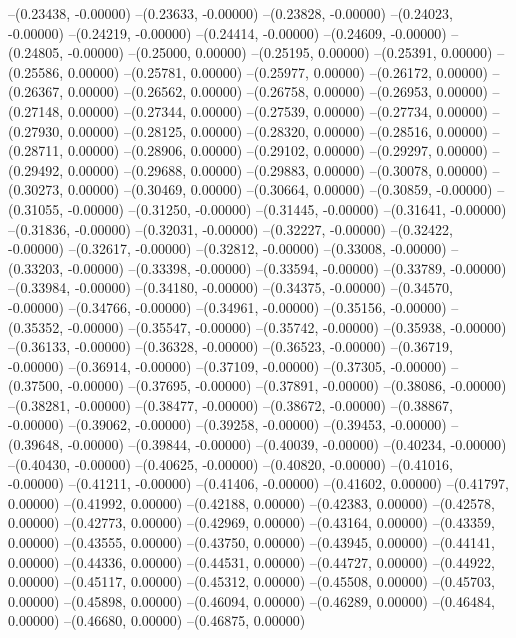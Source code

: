 --(0.23438, -0.00000)
--(0.23633, -0.00000)
--(0.23828, -0.00000)
--(0.24023, -0.00000)
--(0.24219, -0.00000)
--(0.24414, -0.00000)
--(0.24609, -0.00000)
--(0.24805, -0.00000)
--(0.25000, 0.00000)
--(0.25195, 0.00000)
--(0.25391, 0.00000)
--(0.25586, 0.00000)
--(0.25781, 0.00000)
--(0.25977, 0.00000)
--(0.26172, 0.00000)
--(0.26367, 0.00000)
--(0.26562, 0.00000)
--(0.26758, 0.00000)
--(0.26953, 0.00000)
--(0.27148, 0.00000)
--(0.27344, 0.00000)
--(0.27539, 0.00000)
--(0.27734, 0.00000)
--(0.27930, 0.00000)
--(0.28125, 0.00000)
--(0.28320, 0.00000)
--(0.28516, 0.00000)
--(0.28711, 0.00000)
--(0.28906, 0.00000)
--(0.29102, 0.00000)
--(0.29297, 0.00000)
--(0.29492, 0.00000)
--(0.29688, 0.00000)
--(0.29883, 0.00000)
--(0.30078, 0.00000)
--(0.30273, 0.00000)
--(0.30469, 0.00000)
--(0.30664, 0.00000)
--(0.30859, -0.00000)
--(0.31055, -0.00000)
--(0.31250, -0.00000)
--(0.31445, -0.00000)
--(0.31641, -0.00000)
--(0.31836, -0.00000)
--(0.32031, -0.00000)
--(0.32227, -0.00000)
--(0.32422, -0.00000)
--(0.32617, -0.00000)
--(0.32812, -0.00000)
--(0.33008, -0.00000)
--(0.33203, -0.00000)
--(0.33398, -0.00000)
--(0.33594, -0.00000)
--(0.33789, -0.00000)
--(0.33984, -0.00000)
--(0.34180, -0.00000)
--(0.34375, -0.00000)
--(0.34570, -0.00000)
--(0.34766, -0.00000)
--(0.34961, -0.00000)
--(0.35156, -0.00000)
--(0.35352, -0.00000)
--(0.35547, -0.00000)
--(0.35742, -0.00000)
--(0.35938, -0.00000)
--(0.36133, -0.00000)
--(0.36328, -0.00000)
--(0.36523, -0.00000)
--(0.36719, -0.00000)
--(0.36914, -0.00000)
--(0.37109, -0.00000)
--(0.37305, -0.00000)
--(0.37500, -0.00000)
--(0.37695, -0.00000)
--(0.37891, -0.00000)
--(0.38086, -0.00000)
--(0.38281, -0.00000)
--(0.38477, -0.00000)
--(0.38672, -0.00000)
--(0.38867, -0.00000)
--(0.39062, -0.00000)
--(0.39258, -0.00000)
--(0.39453, -0.00000)
--(0.39648, -0.00000)
--(0.39844, -0.00000)
--(0.40039, -0.00000)
--(0.40234, -0.00000)
--(0.40430, -0.00000)
--(0.40625, -0.00000)
--(0.40820, -0.00000)
--(0.41016, -0.00000)
--(0.41211, -0.00000)
--(0.41406, -0.00000)
--(0.41602, 0.00000)
--(0.41797, 0.00000)
--(0.41992, 0.00000)
--(0.42188, 0.00000)
--(0.42383, 0.00000)
--(0.42578, 0.00000)
--(0.42773, 0.00000)
--(0.42969, 0.00000)
--(0.43164, 0.00000)
--(0.43359, 0.00000)
--(0.43555, 0.00000)
--(0.43750, 0.00000)
--(0.43945, 0.00000)
--(0.44141, 0.00000)
--(0.44336, 0.00000)
--(0.44531, 0.00000)
--(0.44727, 0.00000)
--(0.44922, 0.00000)
--(0.45117, 0.00000)
--(0.45312, 0.00000)
--(0.45508, 0.00000)
--(0.45703, 0.00000)
--(0.45898, 0.00000)
--(0.46094, 0.00000)
--(0.46289, 0.00000)
--(0.46484, 0.00000)
--(0.46680, 0.00000)
--(0.46875, 0.00000)
